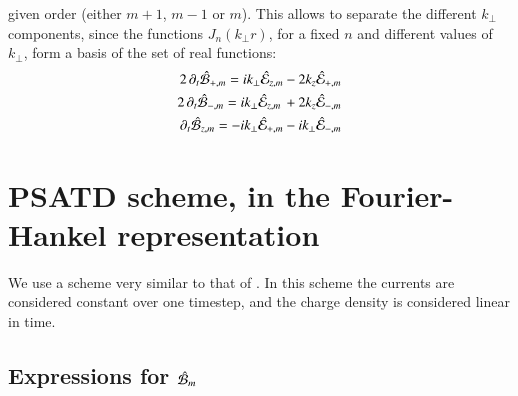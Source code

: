 given order (either $m+1$, $m-1$ or $m$). This allows to separate the
different $k_\perp $ components, since the functions $J_n(k_\perp r)$, for a
fixed $n$ and different values of $k_\perp $, form a basis of the set of real functions:
\begin{subequations}
\begin{align}
2 \,\partial_t \hat{\mathcal{B}}_{+,m} =
ik_\perp \hat{\mathcal{E}}_{z,m} -2 k_z\hat{\mathcal{E}}_{+,m} \\
2\, \partial_t \hat{\mathcal{B}}_{-,m} = ik_\perp \hat{\mathcal{E}}_{z,m} \,
    + 2k_z\hat{\mathcal{E}}_{-,m} \\
 \partial_t \hat{\mathcal{B}}_{z,m} = -ik_\perp \hat{\mathcal{E}}_{+,m}  - ik_\perp \hat{\mathcal{E}}_{-,m}
\end{align}
\end{subequations}

\section{PSATD scheme, in the Fourier-Hankel representation}
\label{sec:PSATDderiv}

We use a scheme very similar to that of \cite{Haber}. In this scheme the currents are considered constant over one timestep, and the charge density is considered linear in time.

\subsection{Expressions for $\hat{\mathcal{B}}_m$}

